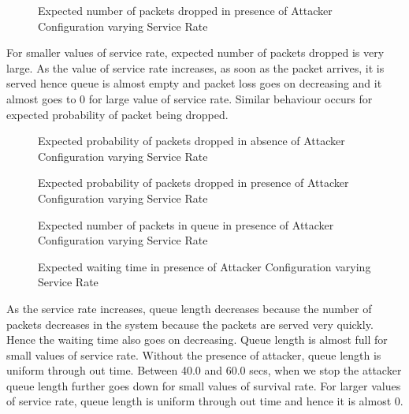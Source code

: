 \begin{figure}[H]
		\centering
		\caption{{Expected number of packets dropped in presence of Attacker Configuration varying Service Rate}}
		\label{fig:figca}
\end{figure}

\pagebreak

For smaller values of service rate, expected number of packets dropped is very large. As the value of service rate increases, as soon as the packet arrives, it is served hence queue is almost empty and packet loss goes on decreasing and it almost goes to 0 for large value of service rate. Similar behaviour occurs for expected probability of packet being dropped. 

\begin{figure}[H]
		\centering
		\caption{{Expected probability of packets dropped in absence of Attacker Configuration varying Service Rate}}
		\label{fig:figcb}
\end{figure}

\begin{figure}[H]
		\centering
		\caption{{Expected probability of packets dropped in presence of Attacker Configuration varying Service Rate}}
		\label{fig:figcc}
\end{figure}

\pagebreak

\begin{figure}[H]
		\centering
		\caption{{Expected number of packets in queue in presence of Attacker Configuration varying Service Rate}}
		\label{fig:figcd}
\end{figure}

\begin{figure}[H]
		\centering
		\caption{{Expected waiting time in presence of Attacker Configuration varying Service Rate}}
		\label{fig:figce}
\end{figure}

As the service rate increases, queue length decreases because the number of packets decreases in the system because the packets are served very quickly. Hence the waiting time also goes on decreasing. Queue length is almost full for small values of service rate. Without the presence of attacker, queue length is uniform through out time. Between 40.0 and 60.0 secs, when we stop the attacker queue length further goes down for small values of survival rate. For larger values of service rate, queue length is uniform through out time and hence it is almost 0.


